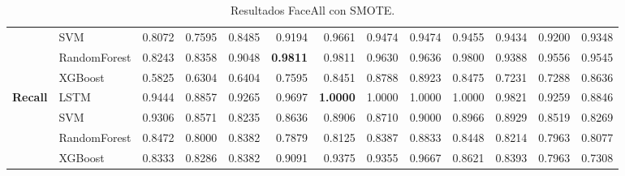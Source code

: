 \begin{table}[h]
\begin{adjustbox}{max width=15cm}
\begin{tabular}{|c|l|r|r|r|r|r|r|r|r|r|r|r|}
	& SVM &  0.8072 &  0.7595 &  0.8485 &  0.9194 &  0.9661 &  0.9474 &  0.9474 &  0.9455 &  0.9434 &  0.9200 &  0.9348 \\
	& RandomForest &  0.8243 &  0.8358 &  0.9048 &  \textbf{0.9811} &  0.9811 &  0.9630 &  0.9636 &  0.9800 &  0.9388 &  0.9556 &  0.9545 \\
	& XGBoost &  0.5825 &  0.6304 &  0.6404 &  0.7595 &  0.8451 &  0.8788 &  0.8923 &  0.8475 &  0.7231 &  0.7288 &  0.8636 \\
	\hline
	\textbf{Recall} & LSTM &  0.9444 &  0.8857 &  0.9265 &  0.9697 &  \textbf{1.0000} &  1.0000 &  1.0000 &  1.0000 &  0.9821 &  0.9259 &  0.8846 \\
	& SVM &  0.9306 &  0.8571 &  0.8235 &  0.8636 &  0.8906 &  0.8710 &  0.9000 &  0.8966 &  0.8929 &  0.8519 &  0.8269 \\
	& RandomForest &  0.8472 &  0.8000 &  0.8382 &  0.7879 &  0.8125 &  0.8387 &  0.8833 &  0.8448 &  0.8214 &  0.7963 &  0.8077 \\
	& XGBoost &  0.8333 &  0.8286 &  0.8382 &  0.9091 &  0.9375 &  0.9355 &  0.9667 &  0.8621 &  0.8393 &  0.7963 &  0.7308 \\
	\hline
	\end{tabular}
	\end{adjustbox}
	\caption{Resultados FaceAll con SMOTE.}
	\label{tab:faceAllSMOTE}
\end{table}

